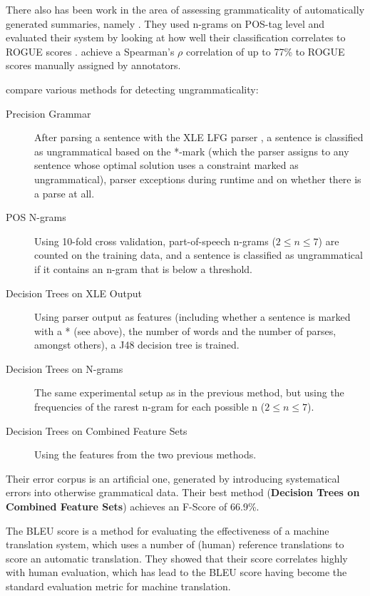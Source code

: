 \documentclass[a4paper,10pt]{scrartcl}
\theoremstyle{style}
\begin{document}
There also has been work in the area of assessing grammaticality of automatically generated summaries, namely \cite{vadlapudi2010automated}. They used n-grams on POS-tag level and evaluated their system by looking at how well their classification correlates to ROGUE scores \citep{lin2004rouge}. \citeauthor{vadlapudi2010automated} achieve a Spearman's $\rho{}$ correlation of up to 77\% to ROGUE scores manually assigned by annotators.

\cite{wagner2007comparative} compare various methods for detecting ungrammaticality:

\begin{description}
	\item[Precision Grammar] After parsing a sentence with the XLE LFG parser \citep{maxwell1996efficient}, a sentence is classified as ungrammatical based on the *-mark (which the parser assigns to any sentence whose optimal solution uses a constraint marked as ungrammatical), parser exceptions during runtime and on whether there is a parse at all.
	\item[POS N-grams] Using 10-fold cross validation, part-of-speech n-grams ($2 \leq n \leq 7$) are counted on the training data, and a sentence is classified as ungrammatical if it contains an n-gram that is below a threshold.
	\item[Decision Trees on XLE Output] Using parser output as features (including whether a sentence is marked with a * (see above), the number of words and the number of parses, amongst others), a J48 decision tree is trained.
	\item[Decision Trees on N-grams] The same experimental setup as in the previous method, but using the frequencies of the rarest n-gram for each possible n ($2 \leq n \leq 7$).
	\item[Decision Trees on Combined Feature Sets] Using the features from the two previous methods.
\end{description}

Their error corpus is an artificial one, generated by introducing systematical errors into otherwise grammatical data. Their best method (\textbf{Decision Trees on Combined Feature Sets}) achieves an F-Score of 66.9\%.

The BLEU score \citep{papineni2002bleu} is a method for evaluating the effectiveness of a machine translation system, which uses a number of (human) reference translations to score an automatic translation. They showed that their score correlates highly with human evaluation, which has lead to the BLEU score having become the standard evaluation metric for machine translation.
\end{document}
